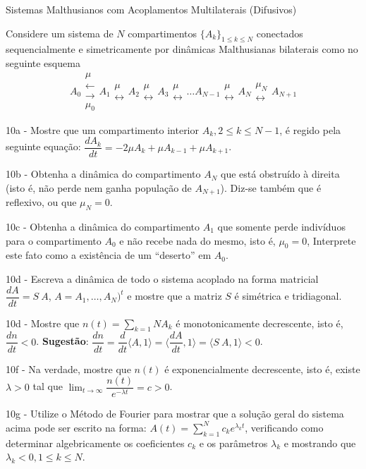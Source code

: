     Sistemas Malthusianos com Acoplamentos Multilaterais (Difusivos)

    Considere um sistema de \(N\) compartimentos \(\{A_k\}_{1 \le k \le N}\) conectados sequencialmente e simetricamente por dinâmicas Malthusianas bilaterais como no seguinte esquema
    \[A_0 \substack{\mu \\ \longleftarrow \\ \longrightarrow \\ \mu_0} 
    A_1 \substack{\mu \\ \longleftrightarrow}
    A_2 \substack{\mu \\ \longleftrightarrow}
    A_3 \substack{\mu \\ \longleftrightarrow}
    \ldots
    A_{N-1} \substack{\mu \\ \longleftrightarrow}
    A_N \substack{\mu_N \\ \longleftrightarrow}
    A_{N+1}\]


    10a - Mostre que um compartimento interior \(A_k , 2 \le k \le N-1\), é regido pela seguinte equação: \(\dfrac{dA_k}{dt} = -2\mu A_k + \mu A_{k-1} + \mu A_{k+1}\).

    10b - Obtenha a dinâmica do compartimento \(A_N\) que está obstruído à direita (isto é, não perde nem ganha população de \(A_{N+1}\)). Diz-se também que é reflexivo, ou que \(\mu_N = 0\).

    10c - Obtenha a dinâmica do compartimento \(A_1\) que somente perde indivíduos para o compartimento \(A_0\) e não recebe nada do mesmo, isto é, \(\mu_0 = 0\), Interprete este fato como a existência de um ``deserto'' em \(A_0\).

    10d - Escreva a dinâmica de todo o sistema acoplado na forma matricial \(\dfrac{dA}{dt} = S\ A\), \(A = A_1, \ldots, A_N)^t\) e mostre que a matriz \(S\) é simétrica e tridiagonal.

    10d - Mostre que \(n(t) = \displaystyle \sum_{k=1}{N} A_k\) é monotonicamente decrescente, isto é, \(\dfrac{dn}{dt} < 0\).
    \textbf{Sugestão}: \(\dfrac{dn}{dt} = \dfrac{d}{dt} \langle A, 1 \rangle = \langle \dfrac{dA}{dt}, 1 \rangle = \langle S\ A, 1 \rangle < 0\).

    10f - Na verdade, mostre que \(n(t)\) é exponencialmente decrescente, isto é, existe \(\lambda > 0\) tal que \(\displaystyle \lim_{t \to \infty} \dfrac{n(t)}{e^{-\lambda t}} = c > 0\).

    10g - Utilize o Método de Fourier para mostrar que a solução geral do sistema acima pode ser escrito na forma: \(A(t) = \displaystyle \sum_{k=1}^{N} c_k e^{\lambda_k t}\), verificando como determinar algebricamente os coeficientes \(c_k\) e os parâmetros \(\lambda_k\) e mostrando que \(\lambda_k < 0, 1 \le k \le N\).

